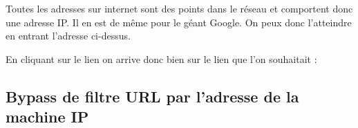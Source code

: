 \documentclass{article}
\begin{document}
Toutes les adresses sur internet sont des points dans le réseau et comportent donc une adresse IP. Il en est de même pour le géant Google. On peux donc l'atteindre en entrant l'adresse ci-dessus.
\vspace{0.2cm}\\
\vspace{0.2cm}

En cliquant sur le lien on arrive donc bien sur le lien que l'on souhaitait :
\vspace{0.2cm}\\
\vspace{0.2cm}

\subsection{Bypass de filtre URL par l'adresse de la machine IP}
\end{document}
